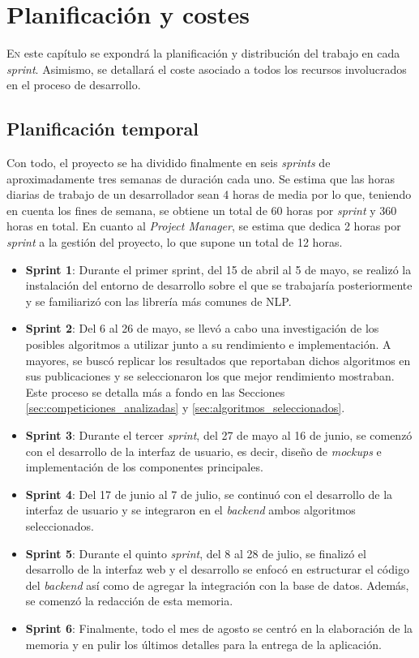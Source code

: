 \chapter{Planificación y costes}
\label{chap:planificacion}

\lettrine{E}{n} este capítulo se expondrá la planificación y distribución del trabajo en cada \textit{sprint}. Asimismo,
se detallará el coste asociado a todos los recursos involucrados en el proceso de desarrollo.

\section{Planificación temporal}
\label{sec:planificacion_temporal}

Con todo, el proyecto se ha dividido finalmente en seis \textit{sprints} de aproximadamente tres semanas de duración cada uno.
Se estima que las horas diarias de trabajo de un desarrollador sean 4 horas de media por lo que, teniendo en cuenta los fines de semana, se obtiene
un total de 60 horas por \textit{sprint} y 360 horas en total. En cuanto al \textit{Project Manager}, se estima que dedica 2 horas por \textit{sprint}
a la gestión del proyecto, lo que supone un total de 12 horas.

\begin{itemize}
	\item \textbf{Sprint 1}: Durante el primer sprint, del 15 de abril al 5 de mayo, se realizó la instalación del entorno
	      de desarrollo sobre el que se trabajaría posteriormente y se familiarizó con las librería más comunes de NLP.
	\item \textbf{Sprint 2}: Del 6 al 26 de mayo, se llevó a cabo una investigación de los posibles algoritmos a utilizar
	      junto a su rendimiento e implementación. A mayores, se buscó replicar los resultados que reportaban dichos algoritmos
	      en sus publicaciones y se seleccionaron los que mejor rendimiento mostraban. Este proceso se detalla más a fondo en las Secciones \ref{sec:competiciones_analizadas} y \ref{sec:algoritmos_seleccionados}.
	\item \textbf{Sprint 3}: Durante el tercer \textit{sprint}, del 27 de mayo al 16 de junio, se comenzó con el desarrollo
	      de la interfaz de usuario, es decir, diseño de \textit{mockups} e implementación de los componentes principales.
	\item \textbf{Sprint 4}: Del 17 de junio al 7 de julio, se continuó con el desarrollo de la interfaz de usuario y se integraron
	      en el \textit{backend} ambos algoritmos seleccionados.
	\item \textbf{Sprint 5}: Durante el quinto \textit{sprint}, del 8 al 28 de julio, se finalizó el desarrollo de la interfaz web
	      y el desarrollo se enfocó en estructurar el código del \textit{backend} así como de agregar la integración con la base de datos.
	      Además, se comenzó la redacción de esta memoria.
	\item \textbf{Sprint 6}: Finalmente, todo el mes de agosto se centró en la elaboración de la memoria y en pulir los últimos detalles
	      para la entrega de la aplicación.
\end{itemize}

